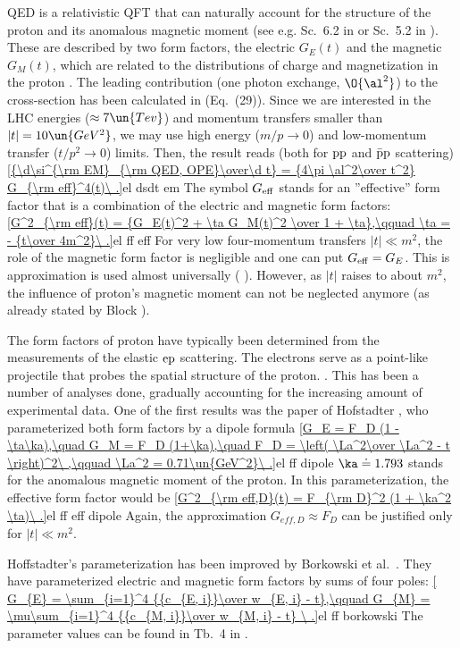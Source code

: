 QED is a relativistic QFT that can naturally account for the structure of the proton and its anomalous magnetic moment (see e.g. Sc.~6.2 in  or Sc.~5.2 in ). These are described by two form factors, the electric $G_E(t)$ and the magnetic $G_M(t)$, which are related to the distributions of charge and magnetization in the proton . The leading contribution (one photon exchange, $\O{\al^2}$) to the cross-section has been calculated in  (Eq.~(29)). Since we are interested in the LHC energies ($\approx 7\un{Tev}$) and momentum transfers smaller than $|t| = 10\un{GeV^2}$, we may use high energy ($m/p\to 0$) and low-momentum transfer ($t/p^2\to 0$) limits. Then, the result reads (both for $\rm pp$ and $\rm \bar p p$ scattering)
\eqref{{\d\si^{\rm EM}_{\rm QED, OPE}\over\d t} = {4\pi \al^2\over t^2} G_{\rm eff}^4(t)\ .}{el dsdt em}
The symbol $G_{\rm eff}$ stands for an ''effective'' form factor that is a combination of the electric and magnetic form factors:
\eqref{G^2_{\rm eff}(t) = {G_E(t)^2 + \ta G_M(t)^2 \over 1 + \ta},\qquad \ta = - {t\over 4m^2}\ .}{el ff eff}
For very low four-momentum transfers $|t| \ll m^2$, the role of the magnetic form factor is negligible and one can put $G_{\rm eff} = G_E$. This is approximation is used almost universally ( ). However, as $|t|$ raises to about $m^2$, the influence of proton's magnetic moment can not be neglected anymore (as already stated by Block ).

The form factors of proton have typically been determined from the measurements of the elastic $\rm ep$ scattering. The electrons serve as a point-like projectile that probes the spatial structure of the proton. .
This has been a number of analyses done, gradually accounting for the increasing amount of experimental data. One of the first results was the paper of Hofstadter , who parameterized both form factors by a dipole formula
\eqref{G_E = F_D (1 - \ta\ka),\quad G_M = F_D (1+\ka),\quad F_D = \left( \La^2\over \La^2 - t \right)^2\ ,\qquad \La^2 = 0.71\un{GeV^2}\ .}{el ff dipole}
$\ka\doteq 1.793$ stands for the anomalous magnetic moment of the proton. In this parameterization, the effective form factor would be
\eqref{G^2_{\rm eff,D}(t) = F_{\rm D}^2 (1 + \ka^2 \ta)\ .}{el ff eff dipole}
Again, the approximation $G_{eff,D}\approx F_D$ can be justified only for $|t| \ll m^2$.

Hoffstadter's parameterization has been improved by Borkowski et al.~. They have parameterized electric and magnetic form factors by sums of four poles:
\eqref{
G_{E} = \sum_{i=1}^4 {{c_{E, i}}\over w_{E, i} - t},\qquad
G_{M} = \mu\sum_{i=1}^4 {{c_{M, i}}\over w_{M, i} - t}
\ .}{el ff borkowski}
The parameter values can be found in Tb.~4 in .

